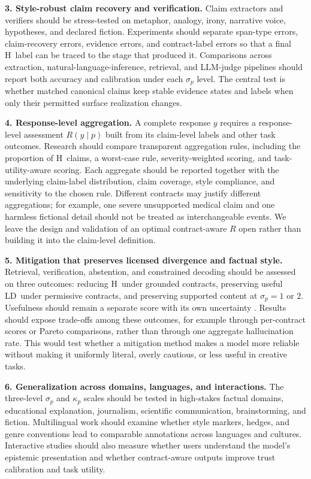 \documentclass{clv2025}
\newcommand{\LD}{\textsc{LD}}
\newcommand{\Hall}{\textsc{H}}
\begin{document}
\textbf{3. Style-robust claim recovery and verification.}
Claim extractors and verifiers should be stress-tested on metaphor, analogy, irony, narrative voice, hypotheses, and declared fiction.
Experiments should separate span-type errors, claim-recovery errors, evidence errors, and contract-label errors so that a final \Hall\ label can be traced to the stage that produced it.
Comparisons across extraction, natural-language-inference, retrieval, and LLM-judge pipelines should report both accuracy and calibration under each $\sigma_p$ level.
The central test is whether matched canonical claims keep stable evidence states and labels when only their permitted surface realization changes.

\textbf{4. Response-level aggregation.}
A complete response $y$ requires a response-level assessment $R(y\mid p)$ built from its claim-level labels and other task outcomes.
Research should compare transparent aggregation rules, including the proportion of \Hall\ claims, a worst-case rule, severity-weighted scoring, and task-utility-aware scoring.
Each aggregate should be reported together with the underlying claim-label distribution, claim coverage, style compliance, and sensitivity to the chosen rule.
Different contracts may justify different aggregations; for example, one severe unsupported medical claim and one harmless fictional detail should not be treated as interchangeable events.
We leave the design and validation of an optimal contract-aware $R$ open rather than building it into the claim-level definition.

\textbf{5. Mitigation that preserves licensed divergence and factual style.}
Retrieval, verification, abstention, and constrained decoding should be assessed on three outcomes: reducing \Hall\ under grounded contracts, preserving useful \LD\ under permissive contracts, and preserving supported content at $\sigma_p=1$ or $2$.
Usefulness should remain a separate score with its own uncertainty \citep{acar_creativity_2019,marco_reader_2025}.
Results should expose trade-offs among these outcomes, for example through per-contract scores or Pareto comparisons, rather than through one aggregate hallucination rate.
This would test whether a mitigation method makes a model more reliable without making it uniformly literal, overly cautious, or less useful in creative tasks.

\textbf{6. Generalization across domains, languages, and interactions.}
The three-level $\sigma_p$ and $\kappa_p$ scales should be tested in high-stakes factual domains, educational explanation, journalism, scientific communication, brainstorming, and fiction.
Multilingual work should examine whether style markers, hedges, and genre conventions lead to comparable annotations across languages and cultures.
Interactive studies should also measure whether users understand the model's epistemic presentation and whether contract-aware outputs improve trust calibration and task utility.
\end{document}
